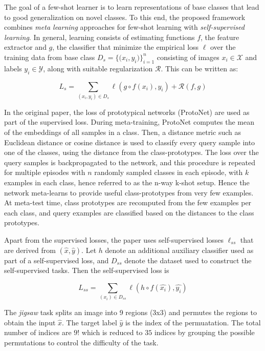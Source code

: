 
The goal of a few-shot learner is to learn representations of base classes that lead to good generalization on novel classes. To this end, the proposed framework combines \textit{meta learning} approaches for few-shot learning with \textit{self-supervised learning}. In general, learning consists of estimating functions $f$, the feature extractor and $g$, the classifier that minimize the empirical loss $\ell$ over the training data from base class $D_{s} = {\{(x_i, y_i})\}_{i=1}^{n}$ consisting of images $x_i \in \mathcal{X}$ and labels $y_i \in \mathcal{Y}$, along with suitable regularization $\mathcal{R}$. This can be written as:

$$L_s = \sum_{(x_i, y_i) \in D_s^{}} \ell(g \circ f(x_i), y_i)  + \mathcal{R}(f,g)$$

In the original paper, the loss of prototypical networks (ProtoNet)\cite{protonets} are used as part of the supervised loss. During meta-training, ProtoNet computes the mean of the embeddings of all samples in a class. Then, a distance metric such as Euclidean distance or cosine distance is used to classify every query sample into one of the classes, using the distance from the class-prototypes. The loss over the query samples is backpropagated to the network, and this procedure is repeated for multiple episodes with $n$ randomly sampled classes in each episode, with $k$ examples in each class, hence referred to as the n-way k-shot setup. Hence the network meta-learns to provide useful class-prototypes from very few examples. At meta-test time, class prototypes are recomputed from the few examples per each class, and query examples are classified based on the distances to the class prototypes.

Apart from the supervised losses, the paper uses self-supervised losses $\ell_{ss}$ that are derived from $(\hat{x}, \hat{y})$. Let $h$ denote an additional auxiliary classifier used as part of a self-supervised loss, and $D_{ss}$ denote the dataset used to construct the self-supervised tasks. Then the self-supervised loss is 

$$L_{ss} = \sum_{(x_i) \in D_{ss}^{}} \ell(h \circ f(\hat{x_i}), \hat{y_i})$$

The \textit{jigsaw} task splits an image into 9 regions (3x3) and permutes the regions to obtain the input $\hat{x}$. The target label $\hat{y}$ is the index of the permuatation. The total number of indices are $9!$ which is reduced to $35$ indices \cite{noroozi2016unsupervised} by grouping the possible permutations to control the difficulty of the task.

